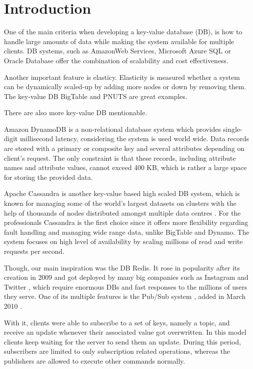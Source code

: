\section{Introduction}
\label{sec:introduction}

One of the main criteria when developing a key-value database (DB), is how to handle large amounts of data while making the system available for multiple clients. DB systems, such as AmazonWeb Services, Microsoft Azure SQL or Oracle Database offer the combination of scalability and cost effectiveness.

Another important feature is elasticy. Elasticity is measured whether a system can be dynamically scaled-up by adding more nodes or down by removing them. The key-value DB BigTable and PNUTS are great examples\cite{agrawal2011database}.

There are also more key-value DB mentionable.

Amazon DynamoDB is a non-relational database system which provides single-digit millisecond latency\cite{amazon}, considering the system is used world wide. Data records are stored with a primary or composite key and several attributes depending on client's request\cite{kalid2017big}. The only constraint is that these records, including attribute names and attribute values, cannot exceed 400 KB\cite{amazon}, which is rather a large space for storing the provided data.

Apache Cassandra is another key-value based high scaled\cite{abadi2012consistency} DB system, which is known for managing some of the world's largest datasets on clusters with the help of thousands of nodes distributed amongst multiple data centres \cite{chebotko2015big}. For the professionals Cassandra is the first choice since it offers more flexibility regarding fault handling and managing wide range data, unlike BigTable and Dynamo\cite{kalid2017big}. The system focuses on high level of availability by scaling millions of read and write requests per second\cite{chebotko2015big}.

Though, our main inspiration was the DB Redis. It rose in popularity after its creation in 2009 and got deployed by many big companies such as Instagram \cite{krieger2011instagram} and Twitter \cite{yu2014twitter}, which require enormous DBs and fast responses to the millions of users they serve. One of its multiple features is the Pub/Sub system \cite{redis2020pubsub}, added in March 2010 \cite{sanfilippo2010pubsub}. 

With it, clients were able to subscribe to a set of keys, namely a topic, and receive an update whenever their associated value got overwritten. In this model clients keep waiting for the server to send them an update. During this period, subscribers are limited to only subscription related operations, whereas the publishers are allowed to execute other commands normally.

